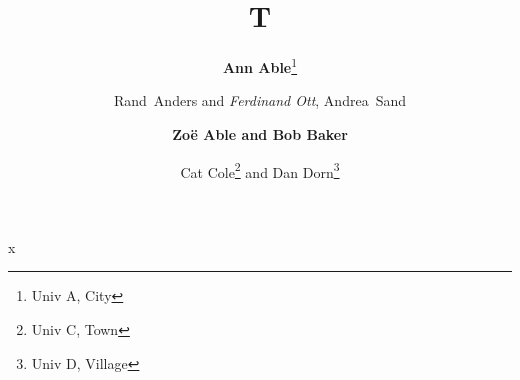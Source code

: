 \documentclass{article}
\newcommand{\auth}[2]{#1\thanks{#2}}
\begin{document}
\title{T}
\author{\textbf{Ann Able}\thanks{Univ A, City}
  \and \mbox{Rand Anders} and \emph{Ferdinand Ott}, \mbox{Andrea Sand}
  \and \textbf{Zo\"{e} Able and Bob Baker}
  \and \auth{Cat Cole}{Univ C, Town} and \auth{Dan Dorn}{Univ D, Village}}
\maketitle
x
\end{document}
